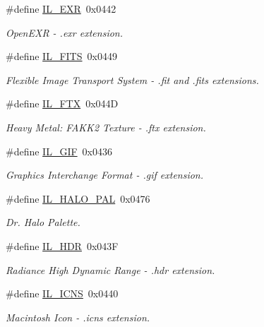 \begin{DoxyCompactItemize}
\#define \hyperlink{group__il__formats_gaf233995bbe2f5eeee67b07365f7178d3}{I\+L\+\_\+\+E\+X\+R}~0x0442
\begin{DoxyCompactList}\small\item\em Open\+E\+X\+R -\/ .exr extension. \end{DoxyCompactList}\item 
\#define \hyperlink{group__il__formats_ga494fe71a2bae847ad8102523e22283d8}{I\+L\+\_\+\+F\+I\+T\+S}~0x0449
\begin{DoxyCompactList}\small\item\em Flexible Image Transport System -\/ .fit and .fits extensions. \end{DoxyCompactList}\item 
\#define \hyperlink{group__il__formats_ga8f0ebc84a1bad958e92132d24efd18d1}{I\+L\+\_\+\+F\+T\+X}~0x044\+D
\begin{DoxyCompactList}\small\item\em Heavy Metal\+: F\+A\+K\+K2 Texture -\/ .ftx extension. \end{DoxyCompactList}\item 
\#define \hyperlink{group__il__formats_gae5b5796118e89d8f9a4badea54dad9b2}{I\+L\+\_\+\+G\+I\+F}~0x0436
\begin{DoxyCompactList}\small\item\em Graphics Interchange Format -\/ .gif extension. \end{DoxyCompactList}\item 
\#define \hyperlink{group__il__formats_ga1d151c60416a04d1b13823cd7c94161f}{I\+L\+\_\+\+H\+A\+L\+O\+\_\+\+P\+A\+L}~0x0476
\begin{DoxyCompactList}\small\item\em Dr. Halo Palette. \end{DoxyCompactList}\item 
\#define \hyperlink{group__il__formats_ga5d64125750873e31db8f469b771d88a7}{I\+L\+\_\+\+H\+D\+R}~0x043\+F
\begin{DoxyCompactList}\small\item\em Radiance High Dynamic Range -\/ .hdr extension. \end{DoxyCompactList}\item 
\#define \hyperlink{group__il__formats_ga9409add4fd49dc5a8d719e8cc2b2a2de}{I\+L\+\_\+\+I\+C\+N\+S}~0x0440
\begin{DoxyCompactList}\small\item\em Macintosh Icon -\/ .icns extension. \end{DoxyCompactList}\item 

\end{DoxyCompactItemize}
